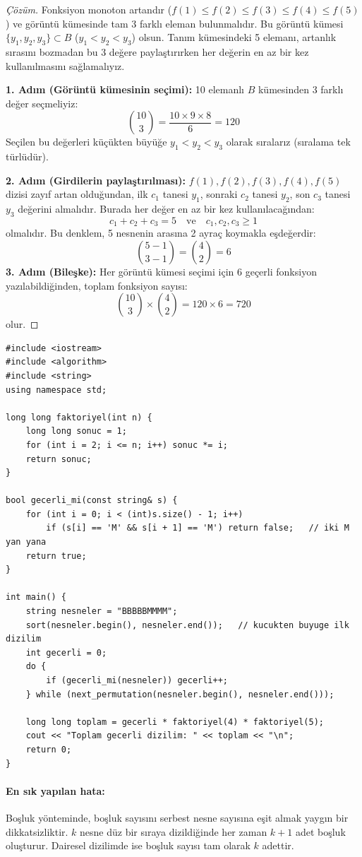 \begin{proof}[Çözüm]
Fonksiyon monoton artandır ($f(1) \le f(2) \le f(3) \le f(4) \le f(5)$) ve görüntü kümesinde tam 3 farklı eleman bulunmalıdır. Bu görüntü kümesi $\{y_1, y_2, y_3\} \subset B$ ($y_1 < y_2 < y_3$) olsun. Tanım kümesindeki 5 elemanı, artanlık sırasını bozmadan bu 3 değere paylaştırırken her değerin en az bir kez kullanılmasını sağlamalıyız.

\textbf{1. Adım (Görüntü kümesinin seçimi):}
10 elemanlı $B$ kümesinden 3 farklı değer seçmeliyiz:
\[
\binom{10}{3} = \frac{10 \times 9 \times 8}{6} = 120
\]
Seçilen bu değerleri küçükten büyüğe $y_1 < y_2 < y_3$ olarak sıralarız (sıralama tek türlüdür).

\textbf{2. Adım (Girdilerin paylaştırılması):}
$f(1), f(2), f(3), f(4), f(5)$ dizisi zayıf artan olduğundan, ilk $c_1$ tanesi $y_1$, sonraki $c_2$ tanesi $y_2$, son $c_3$ tanesi $y_3$ değerini almalıdır.
Burada her değer en az bir kez kullanılacağından:
\[
c_1 + c_2 + c_3 = 5 \quad \text{ve} \quad c_1, c_2, c_3 \ge 1
\]
olmalıdır. Bu denklem, 5 nesnenin arasına 2 ayraç koymakla eşdeğerdir:
\[
\binom{5 - 1}{3 - 1} = \binom{4}{2} = 6
\]
\textbf{3. Adım (Bileşke):}
Her görüntü kümesi seçimi için 6 geçerli fonksiyon yazılabildiğinden, toplam fonksiyon sayısı:
\[
\binom{10}{3} \times \binom{4}{2} = 120 \times 6 = 720
\]
olur.
\end{proof}

\begin{lstlisting}[language=CppTemel]
#include <iostream>
#include <algorithm>
#include <string>
using namespace std;

long long faktoriyel(int n) {
    long long sonuc = 1;
    for (int i = 2; i <= n; i++) sonuc *= i;
    return sonuc;
}

bool gecerli_mi(const string& s) {
    for (int i = 0; i < (int)s.size() - 1; i++)
        if (s[i] == 'M' && s[i + 1] == 'M') return false;   // iki M yan yana
    return true;
}

int main() {
    string nesneler = "BBBBBMMMM";
    sort(nesneler.begin(), nesneler.end());   // kucukten buyuge ilk dizilim
    int gecerli = 0;
    do {
        if (gecerli_mi(nesneler)) gecerli++;
    } while (next_permutation(nesneler.begin(), nesneler.end()));

    long long toplam = gecerli * faktoriyel(4) * faktoriyel(5);
    cout << "Toplam gecerli dizilim: " << toplam << "\n";
    return 0;
}\end{lstlisting}

\paragraph{En sık yapılan hata:}
Boşluk yönteminde, boşluk sayısını serbest nesne sayısına eşit almak yaygın bir dikkatsizliktir. $k$ nesne düz bir sıraya dizildiğinde her zaman $k+1$ adet boşluk oluşturur. Dairesel dizilimde ise boşluk sayısı tam olarak $k$ adettir.

